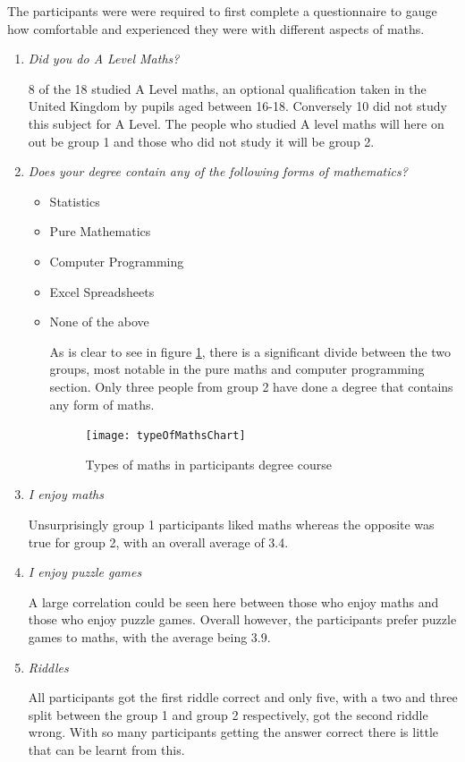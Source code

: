 \documentclass[12pt,a4paper]{report}
\begin{document}
The participants were were required to first complete a questionnaire to gauge how comfortable and experienced they were with different aspects of maths.


\begin{enumerate}
	\item  \textit {Did you do A Level Maths?}
	
	8 of the 18 studied A Level maths, an optional qualification taken in the United Kingdom by pupils aged between 16-18. Conversely 10 did not study this subject for A Level. The people who studied A level maths will here on out be group 1 and those who did not study it will be group 2. 
	
	\item  \textit {Does your degree contain any of the following forms of mathematics?}
	\begin{itemize}
	\item Statistics
	\item Pure Mathematics
	\item Computer Programming
	\item Excel Spreadsheets
	\item None of the above
	
As is clear to see in figure \ref{fig:typeOfMathsChart}, there is a significant divide between the two groups, most notable in the pure maths and computer programming section. Only three people from group 2 have done a degree that contains any form of maths.
	
\begin{figure}[h]
\centering
    \texttt{[image: typeOfMathsChart]}
    \caption{Types of maths in participants degree course}
        \label{fig:typeOfMathsChart}
\end{figure}
\FloatBarrier

\end{itemize}
	
	
	\item  \textit {I enjoy maths}
	
	Unsurprisingly group 1 participants liked maths whereas the opposite was true for group 2, with an overall average of 3.4.
	
	\item  \textit {I enjoy puzzle games}
	
	A large correlation could be seen here between those who enjoy maths and those who enjoy puzzle games. Overall however, the participants prefer puzzle games to maths, with the average being 3.9.
	
	\item  \textit {Riddles}
	
	 All participants got the first riddle correct and only five, with a two and three split between the group 1 and group 2 respectively, got the second riddle wrong. With so many participants getting the answer correct there is little that can be learnt from this.
	
	
\end{enumerate}
\end{document}
